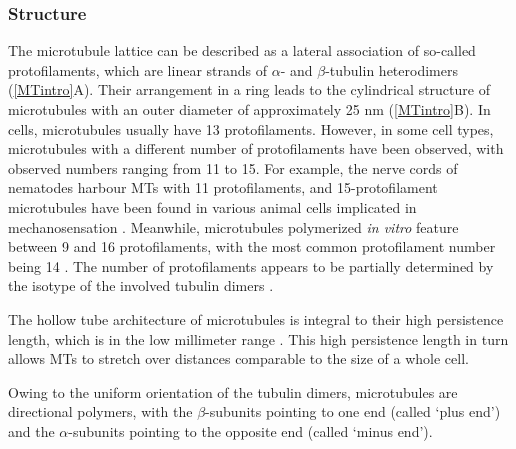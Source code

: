 \subsubsection{Structure}
The microtubule lattice can be described as a lateral association of so-called protofilaments, which are linear strands of $\alpha$- and $\beta$-tubulin heterodimers (\autoref{MTintro}A). Their arrangement in a ring leads to the cylindrical structure of microtubules with an outer diameter of approximately 25 nm (\autoref{MTintro}B). In cells, microtubules usually have 13 protofilaments. However, in some cell types, microtubules with a different number of protofilaments have been observed, with observed numbers ranging from 11 to 15. For example, the nerve cords of nematodes harbour MTs with 11 protofilaments, and 15-protofilament microtubules have been found in various animal cells implicated in mechanosensation \parencite{Chaaban2017}. Meanwhile, microtubules polymerized \textit{in vitro} feature between 9 and 16 protofilaments, with the most common protofilament number being 14 \parencite{Chaaban2017}. The number of protofilaments appears to be partially determined by the isotype of the involved tubulin dimers \parencite{Ti2018}.\par

The hollow tube architecture of microtubules is integral to their high persistence length, which is in the low millimeter range \parencite{Portran2013}. This high persistence length in turn allows MTs to stretch over distances comparable to the size of a whole cell. \par

Owing to the uniform orientation of the tubulin dimers, microtubules are directional polymers, with the $\beta$-subunits pointing to one end (called ‘plus end’) and the $\alpha$-subunits pointing to the opposite end (called ‘minus end’).


